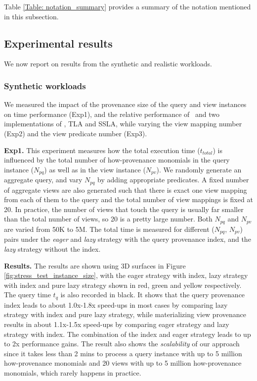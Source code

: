 Table \ref{Table: notation_summary} provides a summary of the notation mentioned in this subsection.%

\subsection{Experimental results}
We now report on results from the synthetic and realistic workloads.

\subsubsection{Synthetic workloads} \label{sec: synthetic_exp}
We measured the impact of the provenance size of the query and view instances on time performance (Exp1), and the relative performance of \provalg\ and two implementations of \rba, TLA and SSLA,  while varying the view mapping number (Exp2) and the view predicate number (Exp3).

\textbf{Exp1.}  This experiment measures how the total execution time ($t_{total}$) is influenced by the total number of how-provenance monomials in the query instance ($N_{pq}$) as well as 
in the view instance ($N_{pv}$). We randomly generate an aggregate query, and vary $N_{pq}$ by adding appropriate predicates. A fixed number of aggregate views are also generated such that there is exact one view mapping from each of them to the query and the total number of view mappings is fixed at 20.  In practice, the number of views that touch the query is usually far smaller than the total number of views, so 20 is a pretty large number. Both $N_{pq}$ and $N_{pv}$ are varied from 50K to 5M. The total time is measured for different ($N_{pq}$, $N_{pv}$) pairs under the {\em eager} and {\em lazy} strategy with the query provenance index, and the {\em lazy} strategy without the index. 

\textbf{Results.} 
The results are shown using 3D surfaces in Figure \ref{fig:stress_test_instance_size}, with the eager strategy with index, lazy strategy with index and pure lazy strategy shown in red, green and yellow respectively. The query time $t_q$ is also recorded in black. It shows that the query provenance index leads to about 1.0x-1.8x speed-ups in most cases by comparing lazy strategy with index and pure lazy strategy, while materializing view provenance results in about 1.1x-1.5x speed-ups by comparing eager strategy and lazy strategy with index. The combination of the index and eager strategy leads to up to 2x performance gains. The result also shows the {\em scalability} of our approach since it takes less than 2 mins to process a query instance with up to 5 million how-provenance monomials and 20 views with up to 5 million how-provenance monomials, which rarely happens in practice. 

